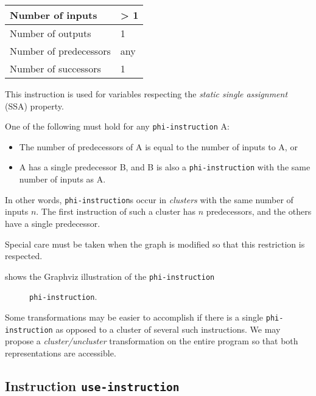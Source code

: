 \begin{tabular}{|l|l|}
\hline
Number of inputs & > 1\\
\hline
Number of outputs & 1\\
\hline
Number of predecessors & any\\
\hline
Number of successors & 1\\
\hline
\end{tabular}

This instruction is used for variables respecting the \emph{static
  single assignment} (SSA) property.  

One of the following must hold for any \texttt{phi-instruction} A:

\begin{itemize}
\item The number of predecessors of A is equal to the number of inputs
  to A, or
\item A has a single predecessor B, and B is also a
  \texttt{phi-instruction} with the same number of inputs as A.
\end{itemize}

In other words, \texttt{phi-instruction}s occur in \emph{clusters}
with the same number of inputs $n$.  The first instruction of such a
cluster has $n$ predecessors, and the others have a single
predecessor. 

Special care must be taken when the graph is modified so that this
restriction is respected. 

 shows the Graphviz illustration of the
\texttt{phi-instruction}

\begin{figure}
\begin{center}
\end{center}
\caption{\label{fig-phi-instruction}
\texttt{phi-instruction}.}
\end{figure}

Some transformations may be easier to accomplish if there is a single
\texttt{phi-instruction} as opposed to a cluster of several such
instructions.  We may propose a \emph{cluster/uncluster}
transformation on the entire program so that both representations are
accessible. 

\subsection{Instruction \texttt{use-instruction}}
\label{mir-instruction-use}

